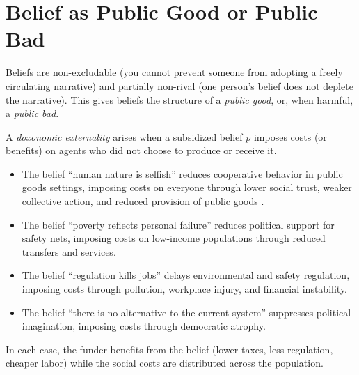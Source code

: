 \section{Belief as Public Good or Public Bad}
\label{sec:ch10-public-good}

Beliefs are non-excludable (you cannot prevent someone from adopting a freely circulating narrative) and partially non-rival (one person's belief does not deplete the narrative).
This gives beliefs the structure of a \emph{public good}, or, when harmful, a \emph{public bad}.

\begin{definition}
\label{def:doxonomic-externality}
A \emph{doxonomic externality} arises when a subsidized belief $p$ imposes costs (or benefits) on agents who did not choose to produce or receive it.
\end{definition}

\begin{example}
\label{ex:negative-externality}
\begin{itemize}[nosep]
  \item The belief ``human nature is selfish'' reduces cooperative behavior in public goods settings, imposing costs on everyone through lower social trust, weaker collective action, and reduced provision of public goods \autocite{fischbacher2001}.
  \item The belief ``poverty reflects personal failure'' reduces political support for safety nets, imposing costs on low-income populations through reduced transfers and services.
  \item The belief ``regulation kills jobs'' delays environmental and safety regulation, imposing costs through pollution, workplace injury, and financial instability.
  \item The belief ``there is no alternative to the current system'' suppresses political imagination, imposing costs through democratic atrophy.
\end{itemize}
In each case, the funder benefits from the belief (lower taxes, less regulation, cheaper labor) while the social costs are distributed across the population.
\end{example}

